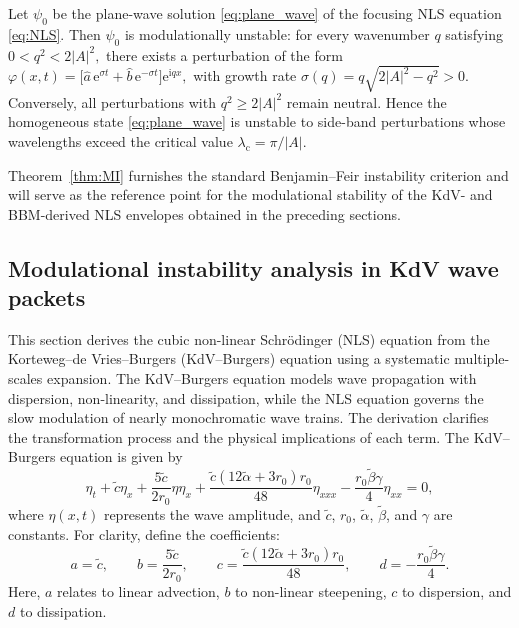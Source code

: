 \documentclass[alpha-refs, 12pt]{wiley-article}
\begin{document}
\begin{theorem}\label{thm:MI}
  Let $\psi_{0}$ be the plane-wave solution \eqref{eq:plane_wave} of the
  focusing NLS equation \eqref{eq:NLS}. Then $\psi_{0}$ is modulationally
  unstable: for every wavenumber $q$ satisfying
  \(
    0<q^{2}<2|A|^{2},
  \)
  there exists a perturbation of the form
  \(
    \displaystyle
    \varphi(x,t)=\bigl[\hat{a}\,\mathrm{e}^{\sigma t}
                     +\hat{b}\,\mathrm{e}^{-\sigma t}\bigr]
                 \mathrm{e}^{\mathrm{i}qx},
  \)
  with growth rate
  \(
    \displaystyle
    \sigma(q)=q\sqrt{2|A|^{2}-q^{2}}>0.
  \)
  Conversely, all perturbations with $q^{2}\ge2|A|^{2}$ remain
  neutral. Hence the homogeneous state \eqref{eq:plane_wave} is unstable
  to side-band perturbations whose wavelengths exceed the critical value
  \(
    \lambda_{\mathrm{c}}=\pi/|A|.
  \)
\end{theorem}
Theorem~\ref{thm:MI} furnishes the standard Benjamin--Feir instability criterion and will serve as the reference point for the modulational stability of the KdV- and BBM-derived NLS envelopes obtained in the preceding sections.

\subsection{Modulational instability analysis in KdV wave packets}

This section derives the cubic non-linear Schr\"odinger (NLS) equation from the Korteweg--de Vries--Burgers (KdV--Burgers) equation using a systematic multiple-scales expansion. The KdV--Burgers equation models wave propagation with dispersion, non-linearity, and dissipation, while the NLS equation governs the slow modulation of nearly monochromatic wave trains. The derivation clarifies the transformation process and the physical implications of each term. The KdV--Burgers equation is given by
\begin{equation}
  \eta_{t} + \tilde{c} \eta_{x} + \frac{5 \tilde{c}}{2 r_{0}} \eta \eta_{x} + \frac{\tilde{c} (12 \tilde{\alpha} + 3 r_{0}) r_{0}}{48} \eta_{xxx} - \frac{r_{0} \tilde{\beta} \gamma}{4} \eta_{xx} = 0,
  \label{eq:kdv_burgers}
\end{equation}
where \(\eta(x,t)\) represents the wave amplitude, and \(\tilde{c}\), \(r_{0}\), \(\tilde{\alpha}\), \(\tilde{\beta}\), and \(\gamma\) are constants. For clarity, define the coefficients:
\begin{equation}
  a = \tilde{c}, \qquad b = \frac{5 \tilde{c}}{2 r_{0}}, \qquad c = \frac{\tilde{c} (12 \tilde{\alpha} + 3 r_{0}) r_{0}}{48}, \qquad d = -\frac{r_{0} \tilde{\beta} \gamma}{4}.
  \label{eq:coeffs}
\end{equation}
Here, \(a\) relates to linear advection, \(b\) to non-linear steepening, \(c\) to dispersion, and \(d\) to dissipation.
\end{document}
